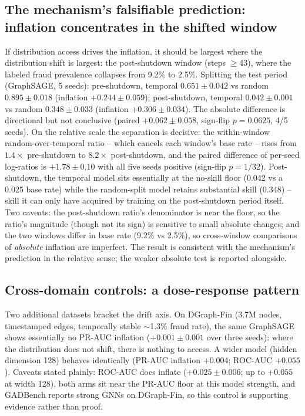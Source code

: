 \documentclass[11pt]{article}
\begin{document}
\subsection{The mechanism's falsifiable prediction: inflation concentrates in the
shifted window}
If distribution access drives the inflation, it should be largest where the
distribution shift is largest: the post-shutdown window (steps $\geq$43), where the
labeled fraud prevalence collapses from 9.2\% to 2.5\%. Splitting the test period
(GraphSAGE, 5 seeds): pre-shutdown, temporal $0.651\pm0.042$ vs random
$0.895\pm0.018$ (inflation $+0.244\pm0.059$); post-shutdown, temporal
$0.042\pm0.001$ vs random $0.348\pm0.033$ (inflation $+0.306\pm0.034$). The
absolute difference is directional but not conclusive (paired $+0.062\pm0.058$,
sign-flip $p=0.0625$, 4/5 seeds). On the relative scale the separation is
decisive: the within-window random-over-temporal ratio -- which cancels each
window's base rate -- rises from $1.4\times$ pre-shutdown to $8.2\times$
post-shutdown, and the paired difference of per-seed log-ratios is $+1.78\pm0.10$
with all five seeds positive (sign-flip $p=1/32$). Post-shutdown, the temporal
model sits essentially at the no-skill floor (0.042 vs a 0.025 base rate) while
the random-split model retains substantial skill (0.348) -- skill it can only
have acquired by training on the post-shutdown period itself. Two caveats: the
post-shutdown ratio's denominator is near the floor, so the ratio's magnitude
(though not its sign) is sensitive to small absolute changes; and the two windows
differ in base rate (9.2\% vs 2.5\%), so cross-window comparisons of
\emph{absolute} inflation are imperfect. The result is consistent with the
mechanism's prediction in the relative sense; the weaker absolute test is
reported alongside.

\subsection{Cross-domain controls: a dose-response pattern}
Two additional datasets bracket the drift axis. On DGraph-Fin
\citep{huang2022dgraph} (3.7M nodes, timestamped edges, temporally stable
$\sim$1.3\% fraud rate), the same GraphSAGE shows essentially no PR-AUC inflation
($+0.001\pm0.001$ over three seeds): where the distribution does not shift, there
is nothing to access. A wider model (hidden dimension 128) behaves identically
(PR-AUC inflation $+0.004$; ROC-AUC $+0.055$). Caveats stated plainly: ROC-AUC
does inflate ($+0.025\pm0.006$; up to $+0.055$ at width 128), both arms sit near
the PR-AUC floor at this model strength, and GADBench reports strong GNNs on
DGraph-Fin, so this control is supporting evidence rather than proof.
\end{document}
